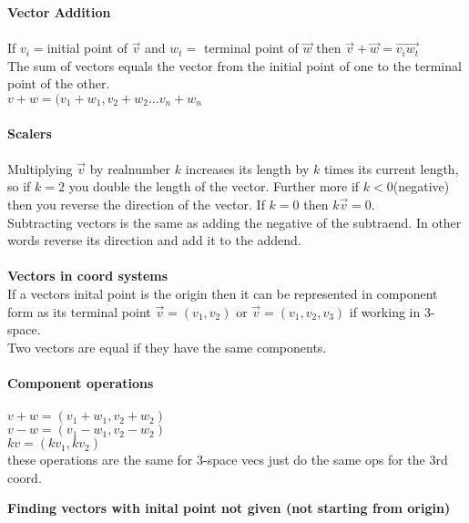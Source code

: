 \documentclass[14pt]{extreport}
\begin{document}
\textbf{Vector Addition}\\\\
If $v_i =$initial point of $\vec{v}$ and $w_t =$ terminal point of $\vec{w}$ then $\vec{v} + \vec{w} = \vec{v_i w_t}$\\

The sum of vectors equals the vector from the initial point of one to the terminal point of the other.\\

$v + w = (v_1 + w_1,  v_2 + w_2 ... v_n + w_n$\\\\


\textbf{Scalers}\\\\

Multiplying $\vec{v}$ by realnumber $k$ increases its length by $k$ times its current length, so if $k=2$ you double the length of the vector. Further more if $k < 0$(negative) then you reverse the direction of the vector. If $k = 0$ then $k\vec{v} = 0$.\\

Subtracting vectors is the same as adding the negative of the subtraend. In other words reverse its direction and add it to the addend.\\\\

\textbf{Vectors in coord systems}\\

If a vectors inital point is the origin then it can be represented in component form as its terminal point $\vec{v} = (v_1, v_2)$ or $\vec{v} = (v_1, v_2, v_3)$ if working in 3-space.\\

Two vectors are equal if they have the same components.\\\\

\textbf{Component operations}\\\\
$v + w = (v_1 + w_1, v_2 + w_2)$\\
$v - w = (v_1 - w_1, v_2 - w_2)$\\
$kv = (kv_1, kv_2)$\\
these operations are the same for 3-space vecs just do the same ops for the 3rd coord.

\textbf{Finding vectors with inital point not given (not starting from origin)}\\\\
\end{document}
